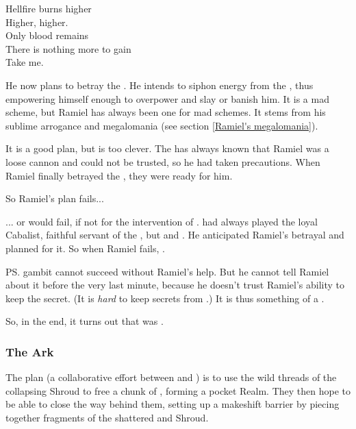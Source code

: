 \begin{garbage}
{  Hellfire burns higher\\
  Higher, higher. \\
  Only blood remains\\
  There is nothing more to gain \\
  Take me.
}

He now plans to betray the \banes. 
He intends to siphon energy from the \Voidbringer, thus empowering himself enough to overpower \Daggerrain{} and slay or banish him. 
It is a mad scheme, but Ramiel has always been one for mad schemes. It stems from his sublime arrogance and megalomania (see section \ref{Ramiel's megalomania}). 

It is a good plan, but \Daggerrain{} is too clever. 
The \banelord{} has always known that Ramiel was a loose cannon and could not be trusted, so he had taken precautions. 
When Ramiel finally betrayed the \banes, they were ready for him. 

So Ramiel's plan fails...

... or would fail, if not for the intervention of \Azraid. 
\Azraid{} had always played the loyal Cabalist, faithful servant of the \banelords, but  and . 
He anticipated Ramiel's betrayal and planned for it. 
So when Ramiel fails, . 

\ps{\Azraid} gambit cannot succeed without Ramiel's help. 
But he cannot tell Ramiel about it before the very last minute, because he doesn't trust Ramiel's ability to keep the secret. 
(It is \emph{hard} to keep secrets from \Daggerrain.) 
It is thus something of a . 

So, in the end, it turns out that \Azraid{} was . 





\subsubsection{The Ark}
The plan (a collaborative effort between \Azraid{} and \Ishnaruchaefir) is to use the wild threads of the collapsing Shroud to  free a chunk of \Miith{}, forming a pocket Realm. 
They then hope to be able to close the way behind them, setting up a makeshift barrier by piecing together fragments of the shattered \CrystalSphere{} and Shroud.


\end{garbage}
